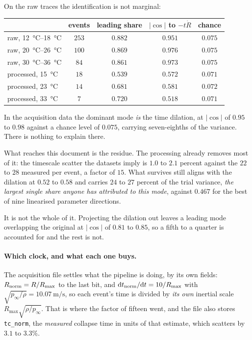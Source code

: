 \documentclass[10pt]{article}
\begin{document}
On the raw traces the identification is not marginal:

\begin{center}
\begin{tabular}{lcccc}
\toprule
& events & leading share & $\lvert\cos\rvert$ to $-t\dot R$ & chance \\
\midrule
raw, \SIrange{12}{18}{\celsius} & $253$ & $0.882$ & $\mathbf{0.951}$ & $0.075$ \\
raw, \SIrange{20}{26}{\celsius} & $100$ & $0.869$ & $\mathbf{0.976}$ & $0.075$ \\
raw, \SIrange{30}{36}{\celsius} & $84$ & $0.861$ & $\mathbf{0.973}$ & $0.075$ \\
\midrule
processed, \SI{15}{\celsius} & $18$ & $0.539$ & $0.572$ & $0.071$ \\
processed, \SI{23}{\celsius} & $14$ & $0.681$ & $0.581$ & $0.072$ \\
processed, \SI{33}{\celsius} & $7$ & $0.720$ & $0.518$ & $0.071$ \\
\bottomrule
\end{tabular}
\end{center}

\noindent In the acquisition data the dominant mode \emph{is} the time dilation, at
$\lvert\cos\rvert$ of $0.95$ to $0.98$ against a chance level of $0.075$, carrying seven-eighths
of the variance. There is nothing to explain there.

What reaches this document is the residue. The processing already removes most of it: the
timescale scatter the datasets imply is $1.0$ to $2.1$ percent against the $22$ to $28$ measured
per event, a factor of $15$. What survives still aligns with the dilation at $0.52$ to $0.58$ and
carries $24$ to $27$ percent of the trial variance, \emph{the largest single share anyone has
attributed to this mode}, against $0.467$ for the best of nine linearised parameter directions.

It is not the whole of it. Projecting the dilation out leaves a leading mode overlapping the
original at $\lvert\cos\rvert$ of $0.81$ to $0.85$, so a fifth to a quarter is accounted for and
the rest is not.

\paragraph{Which clock, and what each one buys.} The acquisition file settles what the pipeline
is doing, by its own fields: $R_{\rm norm} = R/R_{\max}$ to the last bit, and
$\mathrm{d}t_{\rm norm}/\mathrm{d}t = 10/R_{\max}$ with
$\sqrt{p_\infty/\rho} = \SI{10.07}{\metre\per\second}$, so each event's time is divided by
\emph{its own} inertial scale $R_{\max}\sqrt{\rho/p_\infty}$. That is where the factor of fifteen
went, and the file also stores \texttt{tc\_norm}, the \emph{measured} collapse time in units of
that estimate, which scatters by $3.1$ to $3.3\%$.
\end{document}
